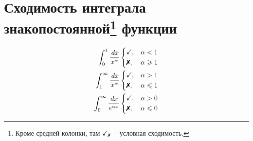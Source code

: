 \section*{Сходимость интеграла знакопостоянной\footnote{
    Кроме средней колонки, там $\checkmark_{\text{\xmark}}$ -- условная сходимость.
} функции}

\begin{minipage}[]{0.25\textwidth}
\begin{equation*}
\begin{split}
        \int_0^1 \frac{\d x}{x^{\alpha}}
        &\left\{\begin{aligned}
            &{
                \checkmark
            }  ,&{
                \alpha < 1
            }\\
            &{
                \text{\xmark}
            }  ,&{
                \alpha \geq 1
            }
        \end{aligned} \right. \\
        \int_1^{\infty} \frac{\d x}{x^{\alpha}}
        &\left\{\begin{aligned}
            &{
                \checkmark
            }  ,&{
                \alpha > 1
            }\\
            &{
                \text{\xmark}
            }  ,&{
                \alpha \leq 1
            }
        \end{aligned} \right.  \\
        \int_0^{\infty} \frac{\d x}{e^{\alpha x}}
        &\left\{\begin{aligned}
            &{
                \checkmark
            }  ,&{
                \alpha > 0
            }\\
            &{
                \text{\xmark}
            }  ,&{
                \alpha \leq 0
            }
        \end{aligned} \right. 
\end{split}
\end{equation*}
\end{minipage}
\hfill
